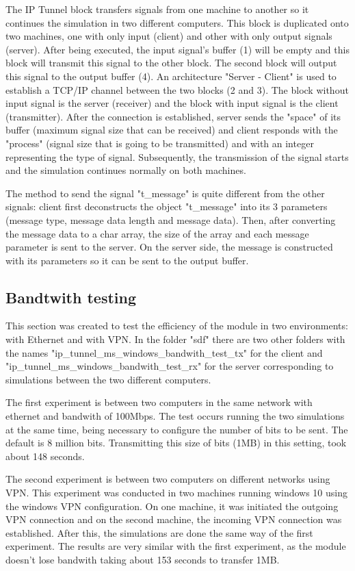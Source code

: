 The IP Tunnel block transfers signals from one machine to another so it continues the simulation in two different computers. This block is duplicated onto two machines, one with only input (client) and other with only output signals (server). After being executed, the input signal's buffer (1) will be empty and this block will transmit this signal to the other block. The second block will output this signal to the output buffer (4). An architecture "Server - Client" is used to establish a TCP/IP channel between the two blocks (2 and 3). The block without input signal is the server (receiver) and the block with input signal is the client (transmitter). After the connection is established, server sends the "space" of its buffer (maximum signal size that can be received) and client responds with the "process" (signal size that is going to be transmitted) and with an integer representing the type of signal. Subsequently, the transmission of the signal starts and the simulation continues normally on both machines.

The method to send the signal "t\_message" is quite different from the other signals: client first deconstructs the object "t\_message" into its 3 parameters (message type, message data length and message data). Then, after converting the message data to a char array, the size of the array and each message parameter is sent to the server. On the server side, the message is constructed with its parameters so it can be sent to the output buffer.


\subsection*{Bandtwith testing}
\par
This section was created to test the efficiency of the module in two environments: with Ethernet and with VPN.
In the folder "sdf" there are two other folders with the names "ip\_tunnel\_ms\_windows\_bandwith\_test\_tx" for the client and "ip\_tunnel\_ms\_windows\_bandwith\_test\_rx" for the server corresponding to  simulations between the two different computers.
\par
The first experiment is between two computers in the same network with ethernet and bandwith of 100Mbps. The test occurs running the two simulations at the same time, being necessary to configure the number of bits to be sent. The default is 8 million bits. Transmitting this size of bits (1MB) in this setting, took about 148 seconds. 
\par
The second experiment is between two computers on different networks using VPN. This experiment was conducted in two machines running windows 10 using the windows VPN configuration. On one machine, it was initiated the outgoing VPN connection and on the second machine, the incoming VPN connection was established. After this, the simulations are done the same way of the first experiment.
The results are very similar with the first experiment, as the module doesn't lose bandwith taking about 153 seconds to transfer 1MB.

